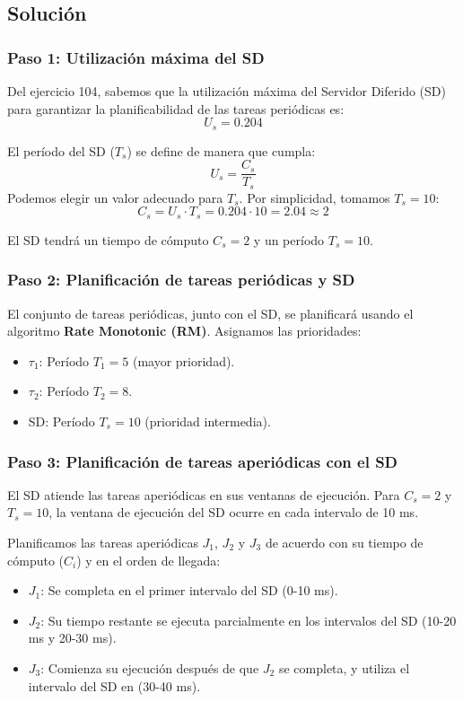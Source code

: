 \documentclass[a4paper,12pt]{article}
\begin{document}
\subsection{Solución}
\subsubsection{Paso 1: Utilización máxima del SD}
Del ejercicio 104, sabemos que la utilización máxima del Servidor Diferido (SD) para garantizar la planificabilidad de las tareas periódicas es:
\[
U_s = 0.204
\]

El período del SD (\(T_s\)) se define de manera que cumpla:
\[
U_s = \frac{C_s}{T_s}
\]
Podemos elegir un valor adecuado para \(T_s\). Por simplicidad, tomamos \(T_s = 10\):
\[
C_s = U_s \cdot T_s = 0.204 \cdot 10 = 2.04 \approx 2
\]

El SD tendrá un tiempo de cómputo \(C_s = 2\) y un período \(T_s = 10\).

\subsubsection{Paso 2: Planificación de tareas periódicas y SD}
El conjunto de tareas periódicas, junto con el SD, se planificará usando el algoritmo \textbf{Rate Monotonic (RM)}. Asignamos las prioridades:
\begin{itemize}
    \item \(\tau_1\): Período \(T_1 = 5\) (mayor prioridad).
    \item \(\tau_2\): Período \(T_2 = 8\).
    \item SD: Período \(T_s = 10\) (prioridad intermedia).
\end{itemize}

\subsubsection{Paso 3: Planificación de tareas aperiódicas con el SD}
El SD atiende las tareas aperiódicas en sus ventanas de ejecución. Para \(C_s = 2\) y \(T_s = 10\), la ventana de ejecución del SD ocurre en cada intervalo de 10 ms.

Planificamos las tareas aperiódicas \(J_1\), \(J_2\) y \(J_3\) de acuerdo con su tiempo de cómputo (\(C_i\)) y en el orden de llegada:
\begin{itemize}
    \item \(J_1\): Se completa en el primer intervalo del SD (0-10 ms).
    \item \(J_2\): Su tiempo restante se ejecuta parcialmente en los intervalos del SD (10-20 ms y 20-30 ms).
    \item \(J_3\): Comienza su ejecución después de que \(J_2\) se completa, y utiliza el intervalo del SD en (30-40 ms).
\end{itemize}
\end{document}

